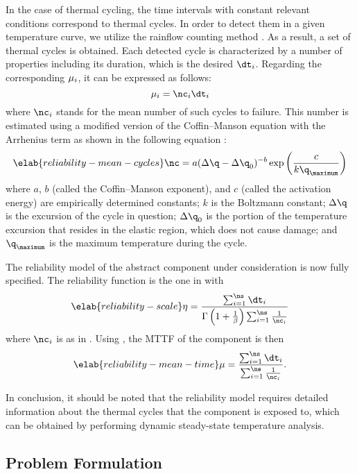 In the case of thermal cycling, the time intervals with constant relevant
conditions correspond to thermal cycles. In order to detect them in a given
temperature curve, we utilize the rainflow counting method \cite{xiang2010}. As
a result, a set of \ns thermal cycles is obtained. Each detected cycle is
characterized by a number of properties including its duration, which is the
desired $\dt_i$. Regarding the corresponding $\mu_i$, it can be expressed as
follows:
\[
  \mean_i = \nc_i \dt_i
\]
where $\nc_i$ stands for the mean number of such cycles to failure. This number
is estimated using a modified version of the Coffin--Manson equation with the
Arrhenius term as shown in the following equation \cite{xiang2010, jedec2010}:
\begin{equation} \elab{reliability-mean-cycles}
  \nc = a (\Delta \q - \Delta \q_0)^{-b} \exp\left(\frac{c}{k \q_\maximum}\right)
\end{equation}
where $a$, $b$ (called the Coffin--Manson exponent), and $c$ (called the
activation energy) are empirically determined constants; $k$ is the Boltzmann
constant; $\Delta \q$ is the excursion of the cycle in question; $\Delta \q_0$
is the portion of the temperature excursion that resides in the elastic region,
which does not cause damage; and $\q_\maximum$ is the maximum temperature during
the cycle.

The reliability model of the abstract component under consideration is now fully
specified. The reliability function is the one in 
with
\begin{equation} \elab{reliability-scale}
  \scale = \frac{\sum_{i = 1}^\ns \dt_i}{\Gamma\left(1 + \frac{1}{\shape}\right) \sum_{i = 1}^\ns \frac{1}{\nc_i}}
\end{equation}
where $\nc_i$ is as in . Using
, the \ac{MTTF} of the
component is then
\begin{equation} \elab{reliability-mean-time}
  \mean = \frac{\sum_{i = 1}^\ns \dt_i}{\sum_{i = 1}^\ns \frac{1}{\nc_i}}.
\end{equation}

In conclusion, it should be noted that the reliability model requires detailed
information about the thermal cycles that the component is exposed to, which can
be obtained by performing dynamic steady-state temperature analysis.

\subsection{Problem Formulation}


